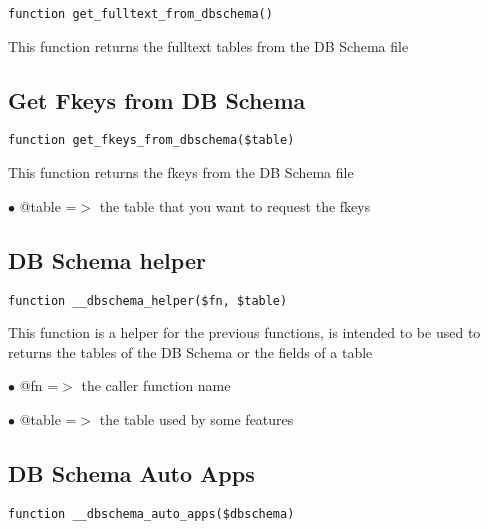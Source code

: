\documentclass[a4paper]{book}
\begin{document}
\begin{lstlisting}
function get_fulltext_from_dbschema()
\end{lstlisting}

This function returns the fulltext tables from the DB Schema file

\hypertarget{toc95}{}
\subsection{Get Fkeys from DB Schema}

\begin{lstlisting}
function get_fkeys_from_dbschema($table)
\end{lstlisting}

This function returns the fkeys from the DB Schema file

\begin{compactitem}
\item[\color{myblue}$\bullet$] @table =$>$ the table that you want to request the fkeys
\end{compactitem}

\hypertarget{toc96}{}
\subsection{DB Schema helper}

\begin{lstlisting}
function __dbschema_helper($fn, $table)
\end{lstlisting}

This function is a helper for the previous functions, is intended to be used
to returns the tables of the DB Schema or the fields of a table

\begin{compactitem}
\item[\color{myblue}$\bullet$] @fn    =$>$ the caller function name
\item[\color{myblue}$\bullet$] @table =$>$ the table used by some features
\end{compactitem}

\hypertarget{toc97}{}
\subsection{DB Schema Auto Apps}

\begin{lstlisting}
function __dbschema_auto_apps($dbschema)
\end{lstlisting}
\end{document}
